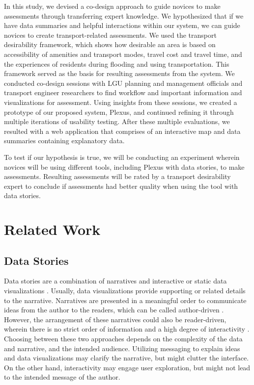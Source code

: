 \documentclass{sigchi}
\begin{document}
In this study, we devised a co-design approach to guide novices to make assessments through transferring expert knowledge. We hypothesized that if we have data summaries and helpful interactions within our system, we can guide novices to create transport-related assessments. We used the transport desirability framework, which shows how desirable an area is based on accessibility of amenities and transport modes, travel cost and travel time, and the experiences of residents during flooding and using transportation. This framework served as the basis for resulting assessments from the system. We conducted co-design sessions with LGU planning and management officials and transport engineer researchers to find workflow and important information and visualizations for assessment. Using insights from these sessions, we created a prototype of our proposed system, Plexus, and continued refining it through multiple iterations of usability testing. After these multiple evaluations, we resulted with a web application that comprises of an interactive map and data summaries containing explanatory data. 

To test if our hypothesis is true, we will be conducting an experiment wherein novices will be using different tools, including Plexus with data stories, to make assessments. Resulting assessments will be rated by a transport desirability expert to conclude if assessments had better quality when using the tool with data stories. 

\section{Related Work}

\subsection{Data Stories}
Data stories are a combination of narratives and interactive or static data visualizations \cite{Segel2011}. Usually, data visualizations provide supporting or related details to the narrative. Narratives are presented in a meaningful order to communicate ideas from the author to the readers, which can be called author-driven \cite{Lee2015}. However, the arrangement of these narratives could also be reader-driven, wherein there is no strict order of information and a high degree of interactivity \cite{Segel2011}. Choosing between these two approaches depends on the complexity of the data and narrative, and the intended audience. Utilizing messaging to explain ideas and data visualizations may clarify the narrative, but might clutter the interface. On the other hand, interactivity may engage user exploration, but might not lead to the intended message of the author. 
\end{document}
